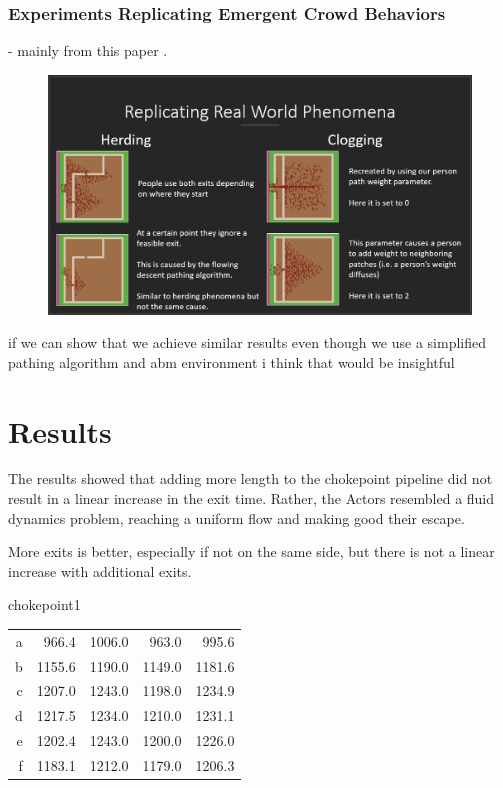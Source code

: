 \documentclass[12pt,letterpaper]{article}
\begin{document}
\subsubsection{Experiments Replicating Emergent Crowd Behaviors}
- mainly from this paper \cite{almeidaCrowdSimulationModeling2013}  .  

\begin{figure}
  \includegraphics[width=\linewidth]{./figures/herding_clogging.png}
  \caption{}
\end{figure}


if we can show that we achieve similar results even though we use a simplified pathing algorithm and abm environment i think that would be insightful


\section{Results}

The results showed that adding more length to the chokepoint pipeline did not
result in a linear increase in the exit time. Rather, the Actors resembled a
fluid dynamics problem, reaching a uniform flow and making good their escape.

More exits is better, especially if not on the same side, but there is not a
linear increase with additional exits.

chokepoint1
\begin{tabular}{ r | r | r | r | r }
a &  966.4 & 1006.0 &  963.0 &  995.6 \\
b & 1155.6 & 1190.0 & 1149.0 & 1181.6 \\
c & 1207.0 & 1243.0 & 1198.0 & 1234.9 \\
d & 1217.5 & 1234.0 & 1210.0 & 1231.1 \\
e & 1202.4 & 1243.0 & 1200.0 & 1226.0 \\
f & 1183.1 & 1212.0 & 1179.0 & 1206.3 \\
\end{tabular}
\end{document}
